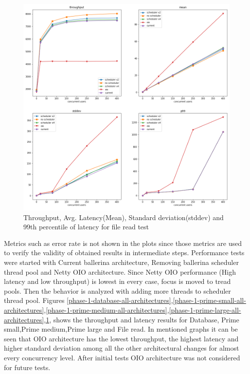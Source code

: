 \begin{figure}[htbp]
	\begin{center}
		\includegraphics[scale=0.5]{figures/file test results.png}
	\end{center}
	\caption{Throughput, Avg. Latency(Mean), Standard deviation(stddev) and 99th percentile of latency for file read test  }
	\label{phase-1-file-read-all-architectures}
\end{figure}

Metrics such as error rate is not shown in the plots since those metrics are used to verify the validity of obtained results in intermediate steps. Performance tests were started with Current ballerina architecture, Removing ballerina scheduler thread pool and Netty OIO architecture. Since Netty OIO performance (High latency and low throughput) is lowest in every case, focus is moved to tread pools. Then the behavior is analyzed with adding more threads to scheduler thread pool. Figures \ref{phase-1-database-all-architectures},\ref{phase-1-prime-small-all-architectures},\ref{phase-1-prime-medium-all-architectures},\ref{phase-1-prime-large-all-architectures},\ref{phase-1-file-read-all-architectures}, shows the throughput and latency results for Database, Prime small,Prime medium,Prime large and File read. In mentioned graphs it can be seen that OIO architecture has the lowest throughput, the highest latency and higher standard deviation among all the other architectural changes for almost every concurrency level. After initial tests OIO architecture was not considered for future tests. 

